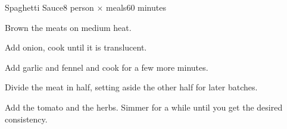 \documentclass[../Cookbook.tex]{subfiles}
\begin{document}
\begin{recipe}[SpaghettiSauce]{Spaghetti Sauce}{8 person $\times$ meals}{60 minutes}

	Brown the meats on medium heat.

	Add onion, cook until it is translucent.

	Add garlic and fennel and cook for a few more minutes.

	\newstep
	Divide the meat in half, setting aside the other half for later batches.

	Add the tomato and the herbs. Simmer for a while until you get the desired consistency.

\end{recipe}
\end{document}
